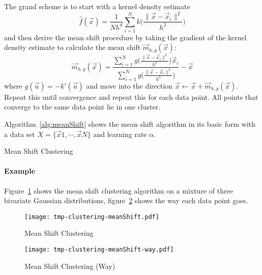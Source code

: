 		The grand scheme is to start with a kernel density estimate
		\begin{equation}
			\hat{f}(\vec{x}) = \frac{1}{Nh^d} \sum_{i = 1}^{N} k\Bigg( \frac{\lVert \vec{x} - \vec{x}_i \rVert^2}{h^2} \Bigg)
		\end{equation}
		and then derive the mean shift procedure by taking the gradient of the kernel density estimate to calculate the mean shift \( \vec{m}_{h, g}(\vec{x}) \):
		\begin{equation}
			\vec{m}_{h, g}(\vec{x}) = \frac{\sum_{i = 1}^{N} g\Big( \frac{\lVert \vec{x} - \vec{x}_i \rVert^2}{h^2} \Big) \vec{x}_i}{\sum_{i = 1}^{N} g\Big( \frac{\lVert \vec{x} - \vec{x}_i \rVert^2}{h^2} \Big)} - \vec{x}
		\end{equation}
		where \( g(\vec{u}) = -k'(\vec{u}) \) and move into the direction \( \vec{x} \gets \vec{x} + \vec{m}_{h, g}(\vec{x}) \). Repeat this until convergence and repeat this for each data point. All points that converge to the same data point lie in one cluster.

		Algorithm~\ref{alg:meanShift} shows the mean shift algorithm in its basic form with a data set \( X = \{ \vec{x}1, \cdots, \vec{x}N \} \) and learning rate \(\alpha\).

		\begin{algorithm}

			\caption{Mean Shift Clustering}
			\label{alg:meanShift}
		\end{algorithm}

		\paragraph{Example} 
			Figure~\ref{fig:meanShiftExample} shows the mean shift clustering algorithm on a mixture of three bivariate Gaussian distributions, figure~\ref{fig:meanShiftExampleWay} shows the way each data point goes.

			\begin{figure}
				\centering
				\texttt{[image: tmp-clustering-meanShift.pdf]}
				\caption{Mean Shift Clustering}
				\label{fig:meanShiftExample}
			\end{figure}
			\begin{figure}
				\centering
				\texttt{[image: tmp-clustering-meanShift-way.pdf]}
				\caption{Mean Shift Clustering (Way)}
				\label{fig:meanShiftExampleWay}
			\end{figure}
	
